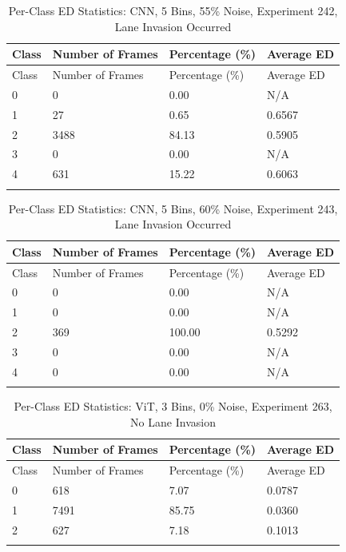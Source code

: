 
\begin{longtable}{@{}llll@{}}
\toprule
Class & Number of Frames & Percentage (\%) & Average ED \\
\midrule
\endfirsthead
\toprule
Class & Number of Frames & Percentage (\%) & Average ED \\
\midrule
\endhead
0 & 0 & 0.00 & N/A \\
1 & 27 & 0.65 & 0.6567 \\
2 & 3488 & 84.13 & 0.5905 \\
3 & 0 & 0.00 & N/A \\
4 & 631 & 15.22 & 0.6063 \\
\bottomrule
\caption{Per-Class ED Statistics: CNN, 5 Bins, 55\% Noise, Experiment 242, Lane Invasion Occurred}
\label{tab:exp242_CNN_5bins_55noise}
\end{longtable}
        


\begin{longtable}{@{}llll@{}}
\toprule
Class & Number of Frames & Percentage (\%) & Average ED \\
\midrule
\endfirsthead
\toprule
Class & Number of Frames & Percentage (\%) & Average ED \\
\midrule
\endhead
0 & 0 & 0.00 & N/A \\
1 & 0 & 0.00 & N/A \\
2 & 369 & 100.00 & 0.5292 \\
3 & 0 & 0.00 & N/A \\
4 & 0 & 0.00 & N/A \\
\bottomrule
\caption{Per-Class ED Statistics: CNN, 5 Bins, 60\% Noise, Experiment 243, Lane Invasion Occurred}
\label{tab:exp243_CNN_5bins_60noise}
\end{longtable}
        


\begin{longtable}{@{}llll@{}}
\toprule
Class & Number of Frames & Percentage (\%) & Average ED \\
\midrule
\endfirsthead
\toprule
Class & Number of Frames & Percentage (\%) & Average ED \\
\midrule
\endhead
0 & 618 & 7.07 & 0.0787 \\
1 & 7491 & 85.75 & 0.0360 \\
2 & 627 & 7.18 & 0.1013 \\
\bottomrule
\caption{Per-Class ED Statistics: ViT, 3 Bins, 0\% Noise, Experiment 263, No Lane Invasion}
\label{tab:exp263_ViT_3bins_0noise}
\end{longtable}
        

